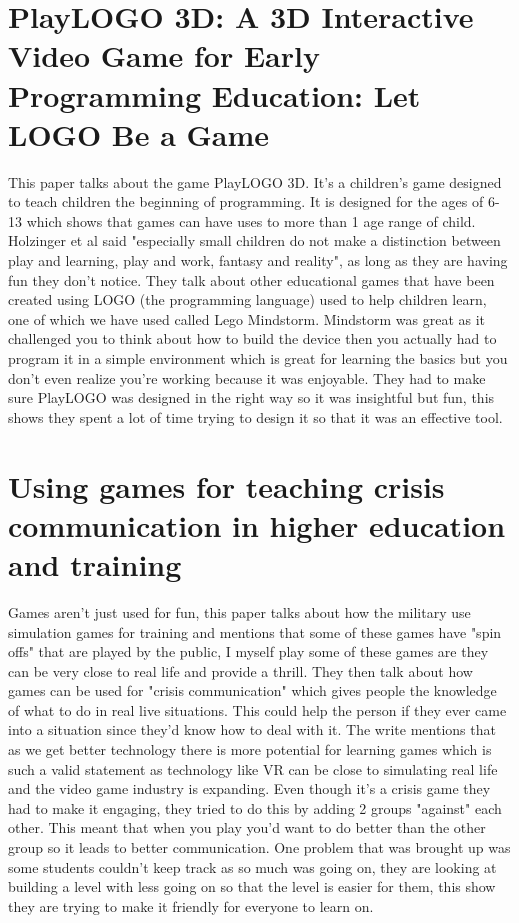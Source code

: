 \documentclass{scrartcl}
\begin{document}
\section{PlayLOGO 3D: A 3D Interactive Video Game for Early Programming Education: Let LOGO Be a Game \cite{paliokas2011playlogo} }
This paper talks about the game PlayLOGO 3D. It's a children's game designed to teach children the beginning of programming. It is designed for the ages of 6-13 which shows that games can have uses to more than 1 age range of child. Holzinger et al said "especially small children do not make a distinction between play and learning, play and work, fantasy and reality", as long as they are having fun they don't notice. They talk about other educational games that have been created using LOGO (the programming language) used to help children learn, one of which we have used called Lego Mindstorm. Mindstorm was great as it challenged you to think about how to build the device then you actually had to program it in a simple environment which is great for learning the basics but you don't even realize you're working because it was enjoyable. They had to make sure PlayLOGO was designed in the right way so it was insightful but fun, this shows they spent a lot of time trying to design it so that it was an effective tool.

\section{Using games for teaching crisis communication in higher education and training \cite{ki2016using} }
Games aren't just used for fun, this paper talks about how the military use simulation games for training and mentions that some of these games have "spin offs" that are played by the public, I myself play some of these games are they can be very close to real life and provide a thrill. They then talk about how games can be used for "crisis communication" which gives people the knowledge of what to do in real live situations. This could help the person if they ever came into a situation since they'd know how to deal with it. The write mentions that as we get better technology there is more potential for learning games which is such a valid statement as technology like VR can be close to simulating real life and the video game industry is expanding. Even though it's a crisis game they had to make it engaging, they tried to do this by adding 2 groups "against" each other. This meant that when you play you'd want to do better than the other group so it leads to better communication. One problem that was brought up was some students couldn't keep track as so much was going on, they are looking at building a level with less going on so that the level is easier for them, this show they are trying to make it friendly for everyone to learn on.
\end{document}
